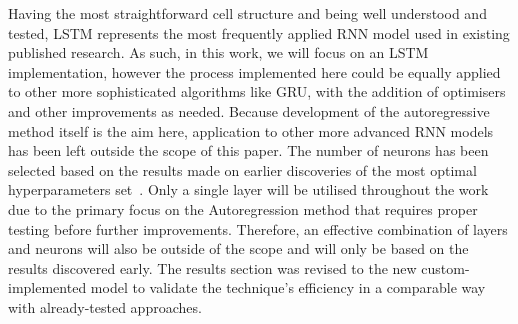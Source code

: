 {Having the most straightforward cell structure and being well understood and tested, LSTM represents the most frequently applied RNN model used in existing published research.
As such, in this work, we will focus on an LSTM implementation, however the process implemented here could be equally applied to other more sophisticated algorithms like GRU, with the addition of optimisers and other improvements as needed.
Because development of the autoregressive method itself is the aim here, application to other more advanced RNN models has been left outside the scope of this paper.
The number of neurons has been selected based on the results made on earlier discoveries of the most optimal hyperparameters set~\cite{sadykov_practical_2022}.
Only a single layer will be utilised throughout the work due to the primary focus on the Autoregression method that requires proper testing before further improvements.
Therefore, an effective combination of layers and neurons will also be outside of the scope and will only be based on the results discovered early.
The results section was revised to the new custom-implemented model to validate the technique's efficiency in a comparable way with already-tested approaches.
\begin{table}[ht]
    \renewcommand{\arraystretch}{1.3}
    \caption{Model structure and parameters}
    \centering
    \label{tab:params}
\end{table}
}

